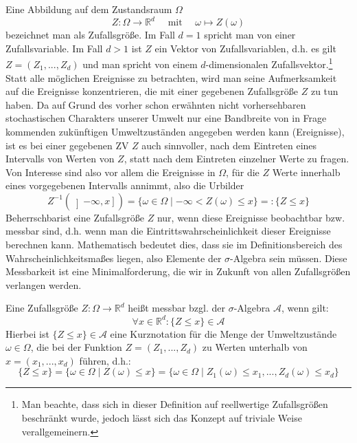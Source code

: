 \documentclass[12pt]{article}
\begin{document}
Eine Abbildung auf dem Zustandsraum $\Omega$ \[
Z : \Omega \to \mathbb{R}^d \quad \text{  mit  }\quad \omega \mapsto Z(\omega)
\]
bezeichnet man als Zufallsgröße. Im Fall $d=1$ spricht man von einer Zufallsvariable. Im Fall
$d>1$ ist $Z$ ein Vektor von Zufallsvariablen, d.h. es gilt $Z = (Z_1, . . . , Z_d)$ und man spricht
von einem $d$-dimensionalen Zufallsvektor.\footnote{Man beachte, dass sich in dieser Definition auf reellwertige Zufallsgrößen beschränkt wurde, jedoch lässt sich das Konzept auf triviale Weise verallgemeinern.}
\\
Statt alle möglichen Ereignisse zu betrachten, wird man seine Aufmerksamkeit auf die
Ereignisse konzentrieren, die mit einer gegebenen Zufallsgröße $Z$ zu tun haben. Da auf
Grund des vorher schon erwähnten nicht vorhersehbaren stochastischen Charakters unserer
Umwelt nur eine Bandbreite von in Frage kommenden zukünftigen Umweltzuständen angegeben
werden kann (Ereignisse), ist es bei einer gegebenen ZV $Z$ auch sinnvoller, nach dem
Eintreten eines Intervalls von Werten von $Z$, statt nach dem Eintreten einzelner Werte zu
fragen. Von Interesse sind also vor allem die Ereignisse in $\Omega$, für die $Z$ Werte innerhalb eines
vorgegebenen Intervalls annimmt, also die Urbilder \[
Z^{-1}(\left] -\infty, x \right] ) = \{ \omega \in \Omega \mid -\infty < Z(\omega) \leq x \} =: \{ Z \leq x \}
\]
\glqq Beherrschbar\grqq  ist eine Zufallsgröße $Z$ nur, wenn diese Ereignisse beobachtbar bzw. \glqq messbar\grqq
sind, d.h. wenn man die Eintrittswahrscheinlichkeit dieser Ereignisse berechnen kann.
Mathematisch bedeutet dies, dass sie im Definitionsbereich des Wahrscheinlichkeitsmaßes
liegen, also Elemente der $\sigma$-Algebra sein müssen. Diese Messbarkeit ist eine Minimalforderung,
die wir in Zukunft von allen Zufallsgrößen verlangen werden.

Eine Zufallsgröße $Z : \Omega \to \mathbb{R}^d $ heißt messbar bzgl. der $\sigma$-Algebra $\mathscr{A}$, wenn gilt:
\[
\forall x \in \mathbb{R}^d : \{Z \leq x\} \in \mathscr{A}
\]
Hierbei ist $\{Z \leq x\} \in \mathscr{A}$ eine Kurznotation für die Menge der Umweltzustände $\omega \in \Omega$, die bei der
Funktion $Z = (Z_1, . . . , Z_d)$ zu Werten unterhalb von $x = (x_1, . . . , x_d)$ führen, d.h.:
\[
\{Z \leq x\} = \{\omega \in \Omega \mid Z(\omega) \leq x\} = \{\omega \in \Omega \mid Z_1(\omega)\leq x_1, ..., Z_d(\omega)\leq x_d\}
\]
\end{document}
